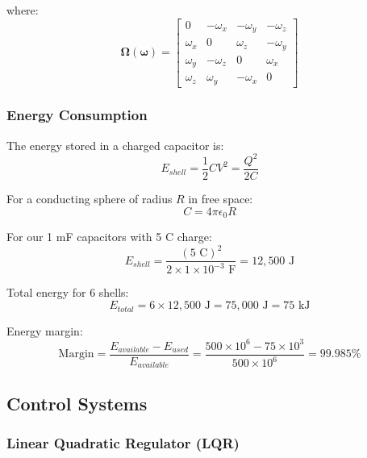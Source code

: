 \documentclass[12pt,a4paper]{article}
\begin{document}
where:
\begin{equation}
\boldsymbol{\Omega}(\boldsymbol{\omega}) = \begin{bmatrix}
0 & -\omega_x & -\omega_y & -\omega_z \\
\omega_x & 0 & \omega_z & -\omega_y \\
\omega_y & -\omega_z & 0 & \omega_x \\
\omega_z & \omega_y & -\omega_x & 0
\end{bmatrix}
\label{eq:omega_matrix}
\end{equation}

\subsubsection{Energy Consumption}

The energy stored in a charged capacitor is:
\begin{equation}
E_{shell} = \frac{1}{2}CV^2 = \frac{Q^2}{2C}
\label{eq:capacitor_energy}
\end{equation}

For a conducting sphere of radius $R$ in free space:
\begin{equation}
C = 4\pi\epsilon_0 R
\label{eq:sphere_capacitance}
\end{equation}

For our 1 mF capacitors with 5 C charge:
\begin{equation}
E_{shell} = \frac{(5\text{ C})^2}{2 \times 1 \times 10^{-3}\text{ F}} = 12,500\text{ J}
\label{eq:energy_per_shell}
\end{equation}

Total energy for 6 shells:
\begin{equation}
E_{total} = 6 \times 12,500\text{ J} = 75,000\text{ J} = 75\text{ kJ}
\label{eq:total_energy}
\end{equation}

Energy margin:
\begin{equation}
\text{Margin} = \frac{E_{available} - E_{used}}{E_{available}} = \frac{500 \times 10^6 - 75 \times 10^3}{500 \times 10^6} = 99.985\%
\label{eq:energy_margin}
\end{equation}

\subsection{Control Systems}

\subsubsection{Linear Quadratic Regulator (LQR)}
\end{document}
